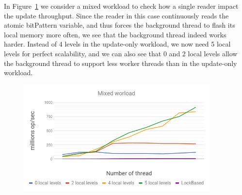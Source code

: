 In Figure~\ref{fig:ConccurentQuantilesReader} we consider a
mixed workload to check how a single reader impact the update
throughput.
Since the reader in this case continuously reads the atomic
bitPattern variable, and thus forces the background thread to
flash its local memory more often, we see that the background
thread indeed works harder.
Instead of 4 levels in the update-only workload, we now need 5
local levels for perfect scalability, and we can also see that
0 and 2 local levels allow the background thread to support less
worker threads than in the update-only workload.




\begin{figure}[h]
  \centering
  \includegraphics*[width=4in]{images/QuantilesMixed}
  \caption{}
   \label{fig:ConccurentQuantilesReader}
\end{figure}

